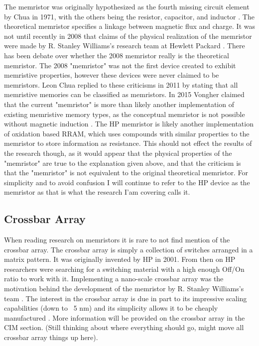 \documentclass{sig-alternate}
\begin{document}
The memristor was originally hypothesized as the fourth missing circuit element by Chua in 1971, with the others being the resistor, capacitor, and inductor \cite{Chua}.  The theoretical memristor specifies a linkage between magnetic flux and charge.  It was not until recently in 2008 that claims of the physical realization of the memristor were made by R. Stanley Williams's research team at Hewlett Packard \cite{MemFound}.  There has been debate over whether the 2008 memristor really is the theoretical memristor.  The 2008 "memristor" was not the first device created to exhibit memristive properties, however these devices were never claimed to be memristors.  Leon Chua replied to these criticisms in 2011 by stating that all memristive memories can be classified as memristors.   In 2015 Vongher claimed that the current "memristor" is more than likely another implementation of existing memristive memory types, as the conceptual memristor is not possible without magnetic induction \cite{MemNotFound}.  The HP memristor is likely another implementation of oxidation based RRAM, which uses compounds with similar properties to the memristor to store information as resistance.  This should not effect the results of the research though, as it would appear that the physical properties of the "memristor" are true to the explanation given above, and that the criticism is that the "memristor" is not equivalent to the original theoretical memristor.  For simplicity and to avoid confusion I will continue to refer to the HP device as the memristor as that is what the research I'am covering calls it.

\subsection{Crossbar Array}
\label{sec:mathEquations}

When reading research on memristors it is rare to not find mention of the crossbar array.  The crossbar array is simply a collection of switches arranged in a matrix pattern. It was originally invented by HP in 2001.  From then on HP researchers were searching for a switching material with a high enough Off/On ratio to work with it.  Implementing a nano-scale crossbar array was the motivation behind the development of the memristor by R. Stanley Williams's team \cite{MemFound}.  The interest in the crossbar array is due in part to its impressive scaling capabilities (down to ~5 nm) and its simplicity allows it to be cheaply manufactured \cite{Hamdioui:2015:MBC:2755753.2757210}.  More information will be provided on the crossbar array in the CIM section. (Still thinking about where everything should go, might move all crossbar array things up here).
\end{document}
